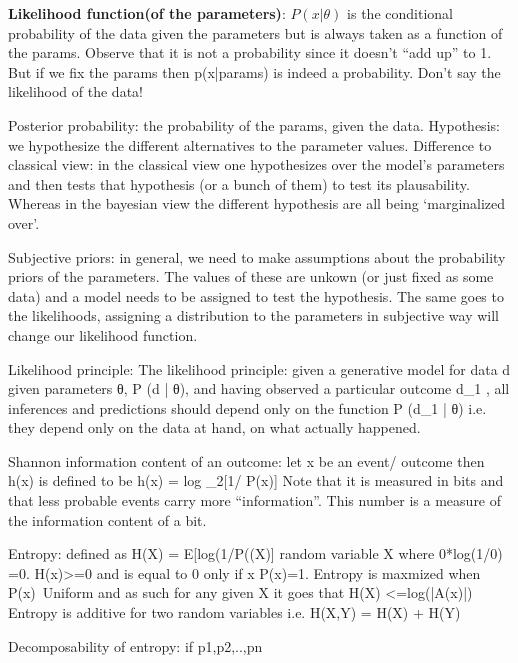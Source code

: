 \textbf{Likelihood function(of the parameters)}: $P(x|\theta)$ is the conditional probability of the data given the parameters but is always taken as a function of the params. Observe that it is not a probability since it doesn't “add up” to 1. But if we fix the params then p(x|params) is indeed a probability. 
Don’t say the likelihood of the data!

Posterior probability: the probability of the params, given the data.
Hypothesis: we hypothesize the different alternatives to the parameter values. 
Difference to classical view: in the classical view one hypothesizes over the model’s parameters and then tests that hypothesis (or a bunch of them) to test its plausability. Whereas in the bayesian view the different hypothesis are all being ‘marginalized over’.

Subjective priors: in general, we need to make assumptions about the probability priors of the parameters. The values of these are unkown (or just fixed as some data) and a model needs to be assigned to test the hypothesis. The same goes to the likelihoods, assigning a distribution to the parameters in subjective way will change our likelihood function.

Likelihood principle: The likelihood principle: given a generative model for data d given parameters θ, P (d | θ), and having observed a particular outcome d_1 , all inferences and predictions should depend only on the function P (d_1 | θ) i.e. they depend only on the data at hand, on what actually happened. 

Shannon information content of an outcome: let x be an event/ outcome then h(x) is defined to be h(x) = log _2[1/ P(x)]
Note that it is measured in bits and that less probable events carry more “information”.
This number is a measure of the information content of a bit. 

Entropy: defined as H(X) =  E[log(1/P((X)] random variable X where 0*log(1/0) =0. H(x)>=0 and is equal to 0 only if x P(x)=1. 
Entropy is maxmized when P(x)~Uniform and as such for any given X it goes that H(X) <=log(|A(x)|)
Entropy is additive for two random variables i.e. H(X,Y) = H(X) + H(Y)

Decomposability of entropy:  if {p1,p2,..,pn}


